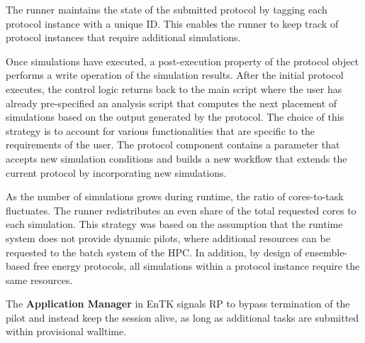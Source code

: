 
The runner maintains the state of the submitted protocol by tagging each 
protocol instance with a unique ID. This enables the runner to keep track of
protocol instances that require additional simulations. 

Once simulations have executed, a post-execution property of the protocol object
performs a write operation of the simulation results. After the initial protocol 
executes, the control logic returns back to the main script where the user has 
already pre-specified an analysis script that computes the next placement of 
simulations based on the output generated by the protocol. The choice of this 
strategy is to account for various functionalities that are specific to the 
requirements of the user. The protocol component contains a parameter that 
accepts new simulation conditions and builds a new workflow that extends the 
current protocol by incorporating new simulations.

As the number of simulations grows during runtime, the ratio of cores-to-task 
fluctuates. The runner redistributes an even share of the total requested cores 
to each simulation. This strategy was based on the assumption that the runtime 
system does not provide dynamic pilots, where additional resources can be 
requested to the batch system of the HPC. In addition, by design of 
ensemble-based free energy protocols, all simulations within a protocol instance
require the same resources. 

The \textbf{Application Manager} in EnTK signals RP to 
bypass termination of the pilot and instead keep the session alive, as long as 
additional tasks are submitted within provisional walltime. 









